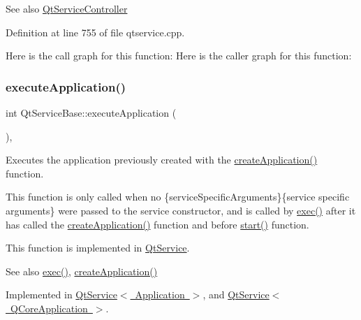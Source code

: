 \begin{DoxySeeAlso}{See also}
\mbox{\hyperlink{class_qt_service_controller}{Qt\+Service\+Controller}} 
\end{DoxySeeAlso}


Definition at line 755 of file qtservice.\+cpp.

Here is the call graph for this function\+:
Here is the caller graph for this function\+:
\mbox{\label{class_qt_service_base_ab70633cd29a22758dfa0502b77e564f6}} 
\subsubsection{\texorpdfstring{execute\+Application()}{executeApplication()}}
{\footnotesize\ttfamily int Qt\+Service\+Base\+::execute\+Application (\begin{DoxyParamCaption}{ }\end{DoxyParamCaption})\hspace{0.3cm}{\ttfamily [protected]}, {}}

Executes the application previously created with the \mbox{\hyperlink{class_qt_service_base_ac5ae73935f489282b35c70b27b341390}{create\+Application()}} function.

This function is only called when no  \{service\+Specific\+Arguments\}\{service specific arguments\} were passed to the service constructor, and is called by \mbox{\hyperlink{class_qt_service_base_afae2e589de71c1ae3ae8db3dc9ab9c64}{exec()}} after it has called the \mbox{\hyperlink{class_qt_service_base_ac5ae73935f489282b35c70b27b341390}{create\+Application()}} function and before \mbox{\hyperlink{class_qt_service_base_adbc0cd621b41bd3a6a1f62fda432e9e4}{start()}} function.

This function is implemented in \mbox{\hyperlink{class_qt_service}{Qt\+Service}}.

\begin{DoxySeeAlso}{See also}
\mbox{\hyperlink{class_qt_service_base_afae2e589de71c1ae3ae8db3dc9ab9c64}{exec()}}, \mbox{\hyperlink{class_qt_service_base_ac5ae73935f489282b35c70b27b341390}{create\+Application()}} 
\end{DoxySeeAlso}


Implemented in \mbox{\hyperlink{class_qt_service_a84f5f60304117e1f11cc0ed16dc0b72e}{Qt\+Service$<$ Application $>$}}, and \mbox{\hyperlink{class_qt_service_a84f5f60304117e1f11cc0ed16dc0b72e}{Qt\+Service$<$ Q\+Core\+Application $>$}}.

